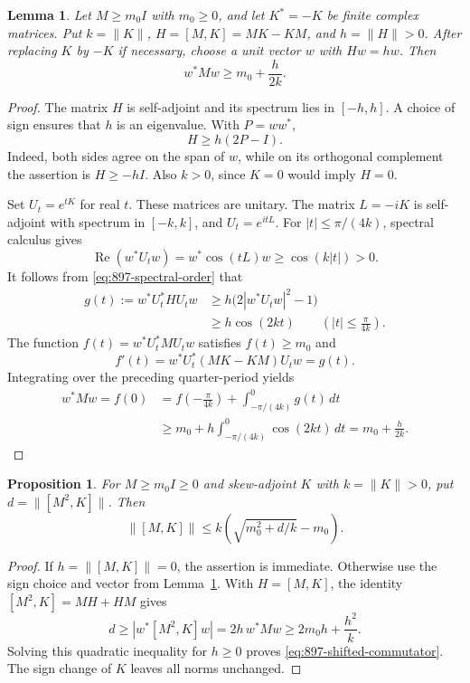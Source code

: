 \documentclass[11pt,a4paper]{article}
\newtheorem{lemma}[theorem]{Lemma}
\newtheorem{proposition}[theorem]{Proposition}
\theoremstyle{remark}
\begin{document}
\begin{lemma}\label{lem:897-orbit-energy}
Let $M\ge m_0I$ with $m_0\ge0$, and let $K^*=-K$ be finite complex
matrices. Put $k=\|K\|$, $H=[M,K]=MK-KM$, and $h=\|H\|>0$.
After replacing $K$ by $-K$ if necessary, choose a unit vector $w$ with
$Hw=hw$. Then
\[
 w^*Mw\ge m_0+\frac{h}{2k}.
 \tag{897.1}\label{eq:897-mean}
\]
\end{lemma}
\begin{proof}
The matrix $H$ is self-adjoint and its spectrum lies in $[-h,h]$.
A choice of sign ensures that $h$ is an eigenvalue. With $P=ww^*$,
\[
 H\ge h(2P-I).
 \tag{897.2}\label{eq:897-spectral-order}
\]
Indeed, both sides agree on the span of $w$, while on its orthogonal
complement the assertion is $H\ge-hI$. Also $k>0$, since $K=0$ would
imply $H=0$.

Set $U_t=e^{tK}$ for real $t$. These matrices are unitary. The matrix
$L=-iK$ is self-adjoint with spectrum in $[-k,k]$, and $U_t=e^{itL}$.
For $|t|\le\pi/(4k)$, spectral calculus gives
\[
 \operatorname{Re}(w^*U_tw)
 =w^*\cos(tL)w\ge\cos(k|t|)>0.
\]
It follows from \eqref{eq:897-spectral-order} that
\[
 \begin{split}
 g(t):=w^*U_t^*HU_tw
 &\ge h\bigl(2|w^*U_tw|^2-1\bigr)\\
 &\ge h\cos(2kt)
 \qquad\left(|t|\le\frac{\pi}{4k}\right).
 \end{split}
 \tag{897.3}\label{eq:897-orbit-bound}
\]
The function $f(t)=w^*U_t^*MU_tw$ satisfies $f(t)\ge m_0$ and
\[
 f'(t)=w^*U_t^*(MK-KM)U_tw=g(t).
\]
Integrating over the preceding quarter-period yields
\[
 \begin{split}
 w^*Mw=f(0)
 &=f\left(-\frac{\pi}{4k}\right)
   +\int_{-\pi/(4k)}^0g(t)\,dt\\
 &\ge m_0+h\int_{-\pi/(4k)}^0\cos(2kt)\,dt
 =m_0+\frac{h}{2k}.
 \end{split}
\]
\end{proof}

\begin{proposition}\label{prop:897-shifted-commutator}
For $M\ge m_0I\ge0$ and skew-adjoint $K$ with $k=\|K\|>0$, put
$d=\|[M^2,K]\|$. Then
\[
 \|[M,K]\|
 \le k\left(\sqrt{m_0^2+d/k}-m_0\right).
 \tag{897.4}\label{eq:897-shifted-commutator}
\]
\end{proposition}
\begin{proof}
If $h=\|[M,K]\|=0$, the assertion is immediate. Otherwise use the sign
choice and vector from Lemma~\ref{lem:897-orbit-energy}. With
$H=[M,K]$, the identity $[M^2,K]=MH+HM$ gives
\[
 d\ge\left|w^*[M^2,K]w\right|
   =2h\,w^*Mw
   \ge2m_0h+\frac{h^2}{k}.
\]
Solving this quadratic inequality for $h\ge0$ proves
\eqref{eq:897-shifted-commutator}. The sign change of $K$ leaves all
norms unchanged.
\end{proof}
\end{document}
